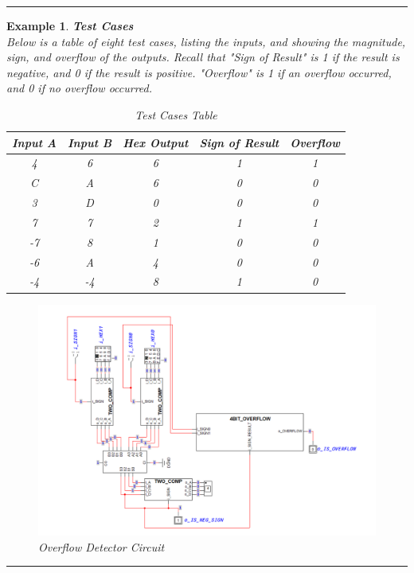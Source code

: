 \documentclass[12pt]{article}
\newtheorem{example}{Example}
\newenvironment{examp}
{\vspace{0.5cm}
\hrule
\begin{example}}
{\hrule
\vspace{0.5cm}
\end{example}}
\begin{document}
\begin{examp}
	\textbf{Test Cases} \\
	Below is a table of eight test cases, listing the inputs, and showing the magnitude, sign, and overflow of the outputs.
	Recall that "Sign of Result" is 1 if the result is negative, and 0 if the result is positive. "Overflow" is 1 if an overflow occurred, and 0 if no overflow occurred.
	\begin{table}[H]
		\centering
		\begin{tabular}{|c|c|c|c|c|}
			\hline
			\textbf{Input A} & \textbf{Input B} & \textbf{Hex Output} & \textbf{Sign of Result} & \textbf{Overflow} \\
			\hline
			4                & 6                & 6                   & 1                       & 1                 \\
			C                & A                & 6                   & 0                       & 0                 \\
			3                & D                & 0                   & 0                       & 0                 \\
			7                & 7                & 2                   & 1                       & 1                 \\
			-7               & 8                & 1                   & 0                       & 0                 \\
			-6               & A                & 4                   & 0                       & 0                 \\
			-4               & -4               & 8                   & 1                       & 0                 \\
			\hline
		\end{tabular}
		\caption{Test Cases Table}
	\end{table}
	\begin{figure}[H]
		\centering
		\includegraphics[scale=.5]{overflower.png}
		\caption{Overflow Detector Circuit}
	\end{figure}

\end{examp}
\end{document}
